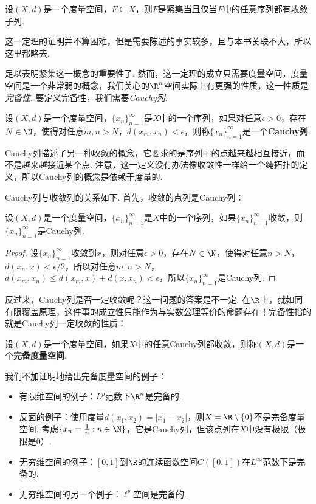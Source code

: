 \begin{theorem}\label{thm:compact-converge}
    设$(X,d)$是一个度量空间，$F\subseteq X$，则$F$是紧集当且仅当$F$中的任意序列都有收敛子列. 
\end{theorem}

这一定理的证明并不算困难，但是需要陈述的事实较多，且与本书关联不大，所以这里都略去. 

 足以表明紧集这一概念的重要性了. 然而，这一定理的成立只需要度量空间，度量空间是一个非常弱的概念，我们关心的$\R^n$空间实际上有更强的性质，这一性质是\emph{完备性}. 要定义完备性，我们需要\emph{Cauchy列}. 

\begin{definition}[Cauchy列]
    设$(X,d)$是一个度量空间，$\{x_n\}_{n=1}^\infty$是$X$中的一个序列，如果对任意$\epsilon>0$，存在$N\in\N$，使得对任意$m,n>N$，$d(x_m,x_n)<\epsilon$，则称$\{x_n\}_{n=1}^\infty$是一个\textbf{Cauchy列}. 
\end{definition}

Cauchy列描述了另一种收敛的概念，它要求的是序列中的点越来越相互接近，而不是越来越接近某个点. 注意，这一定义没有办法像收敛性一样给一个纯拓扑的定义，所以Cauchy列的概念是依赖于度量的. 

Cauchy列与收敛列的关系如下. 首先，收敛的点列是Cauchy列：

\begin{proposition}\label{prop:cauchy-converge}
    设$(X,d)$是一个度量空间，$\{x_n\}_{n=1}^\infty$是$X$中的一个序列，如果$\{x_n\}_{n=1}^\infty$收敛，则$\{x_n\}_{n=1}^\infty$是Cauchy列. 
\end{proposition}
\begin{proof}
    设$\{x_n\}_{n=1}^\infty$收敛到$x$，则对任意$\epsilon>0$，存在$N\in\N$，使得对任意$n>N$，$d(x_n,x)<\epsilon/2$，所以对任意$m,n>N$，$d(x_m,x_n)\leq d(x_m,x)+d(x,x_n)<\epsilon$，所以$\{x_n\}_{n=1}^\infty$是Cauchy列. 
\end{proof}

反过来，Cauchy列是否一定收敛呢？这一问题的答案是不一定. 在$\R$上，就如同有限覆盖原理，这件事的成立性只能作为与实数公理等价的命题存在！完备性指的就是Cauchy列一定收敛的性质：

\begin{definition}[完备度量空间]
    设$(X,d)$是一个度量空间，如果$X$中的任意Cauchy列都收敛，则称$(X,d)$是一个\textbf{完备度量空间}. 
\end{definition}
我们不加证明地给出完备度量空间的例子：
\begin{example}
\begin{itemize}
\item 有限维空间的例子：$L^p$范数下$\R^n$是完备的.
\item 反面的例子：使用度量$d(x_1,x_2)=|x_1-x_2|$，则$X=\R\setminus\{0\}$不是完备度量空间. 考虑$\{x_n=\frac1n:n\in\N\}$，它是Cauchy列，但该点列在$X$中没有极限（极限是$0$）.
\item 无穷维空间的例子：$[0,1]$到$\R$的连续函数空间$C([0,1])$在$L^\infty$范数下是完备的.
\item 无穷维空间的另一个例子：$\ell^p$空间是完备的. 
\end{itemize}
\end{example}

